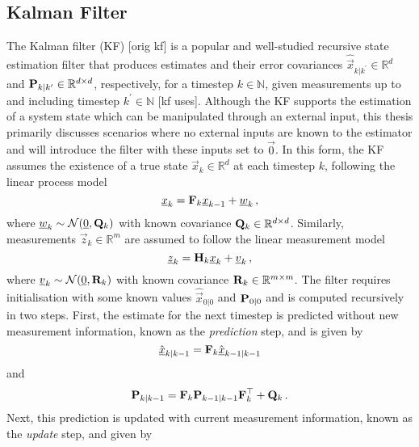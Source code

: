 \subsection{Kalman Filter}\label{subsec:prelims:kf}
The Kalman filter (KF) [orig kf] is a popular and well-studied recursive state estimation filter that produces estimates and their error covariances $\hat{\vec{x}}_{k|k^\prime} \in \mathbb{R}^d$ and ${{\mathbf{P}}}_{k|k^\prime} \in \mathbb{R}^{d \times d}$, respectively, for a timestep $k \in \mathbb{N}$, given measurements up to and including timestep $k^\prime \in \mathbb{N}$ [kf uses]. Although the KF supports the estimation of a system state which can be manipulated through an external input, this thesis primarily discusses scenarios where no external inputs are known to the estimator and will introduce the filter with these inputs set to $\vec{0}$. In this form, the KF assumes the existence of a true state $\vec{x}_k \in \mathbb{R}^d$ at each timestep $k$, following the linear process model
\begin{equation}\label{eq:prelims:lin_gauss_process_model}
    {\underline{x}}_k = {{\mathbf{F}}}_k {\underline{x}}_{k-1} + {\underline{w}}_k\,,
\end{equation}
where ${\underline{w}}_k \sim \mathcal{N}({\underline{0}}, {{\mathbf{Q}}}_k)$ with known covariance ${{\mathbf{Q}}}_k \in \mathbb{R}^{d \times d}$. Similarly, measurements $\vec{z}_k \in \mathbb{R}^m$ are assumed to follow the linear measurement model
\begin{equation}\label{eq:prelims:lin_gauss_measurement_model}
    {\underline{z}}_k = {{\mathbf{H}}}_k {\underline{x}}_k + {\underline{v}}_k\,,
\end{equation}
where ${\underline{v}}_k \sim \mathcal{N}({\underline{0}}, {{\mathbf{R}}}_k)$ with known covariance ${{\mathbf{R}}}_k \in \mathbb{R}^{m \times m}$. The filter requires initialisation with some known values $\hat{\vec{x}}_{0|0}$ and ${{\mathbf{P}}}_{0|0}$ and is computed recursively in two steps. First, the estimate for the next timestep is predicted without new measurement information, known as the \textit{prediction} step, and is given by
\begin{equation}\label{eq:prelims:kf_est_predict}
    \hat{{\underline{x}}}_{k|k-1} = {{\mathbf{F}}}_k \hat{{\underline{x}}}_{k-1|k-1}
\end{equation}
and
\begin{equation}\label{eq:prelims:kf_cov_predict}
    {\ensuremath{{\mathbf{P}}}}_{k|k-1} = {{\mathbf{F}}}_k {{\mathbf{P}}}_{k-1|k-1} {{\mathbf{F}}}_k^\top + {{\mathbf{Q}}}_k\,.
\end{equation}
Next, this prediction is updated with current measurement information, known as the \textit{update} step, and given by
